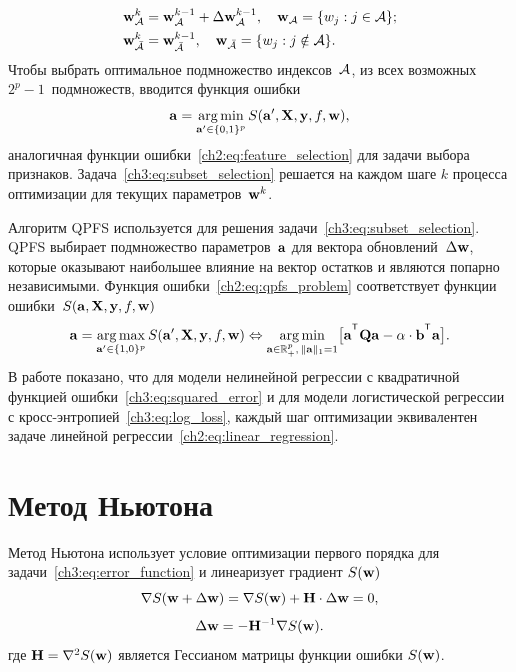 \begin{align*}
\mathbf{w}_{\mathcal{A}}^k &= \mathbf{w}_{\mathcal{A}}^{k - 1} + \Delta \mathbf{w}_{\mathcal{A}}^{k - 1}, \quad \mathbf{w}_{\mathcal{A}} = \{w_j: j \in \mathcal{A} \}; \\
\mathbf{w}_{\bar{\mathcal{A}}}^k &= \mathbf{w}_{\bar{\mathcal{A}}}^{k - 1}, \quad \mathbf{w}_{\bar{\mathcal{A}}} = \{w_j: j \notin \mathcal{A} \}.
\end{align*}
Чтобы выбрать оптимальное подмножество индексов~$\mathcal{A}$, из всех возможных $2^p - 1$~подмножеств, вводится функция ошибки
\begin{equation}
\mathbf{a} = \mathop{\arg \min}\limits_{\mathbf{a}' \in \{0, 1\}^p} S(\mathbf{a}', \mathbf{X}, \mathbf{y}, f, \mathbf{w}),
\label{ch3:eq:subset_selection}
\end{equation}
аналогичная функции ошибки~\eqref{ch2:eq:feature_selection} для задачи выбора признаков. 
Задача~\eqref{ch3:eq:subset_selection} решается на каждом шаге $k$ процесса оптимизации для текущих параметров~$\mathbf{w}^k$.

Алгоритм QPFS используется для решения задачи~\eqref{ch3:eq:subset_selection}.
QPFS выбирает подмножество параметров~$\mathbf{a}$ для вектора обновлений~$ \Delta \mathbf{w}$, которые оказывают наибольшее влияние на вектор остатков и являются попарно независимыми.
Функция ошибки~\eqref{ch2:eq:qpfs_problem} соответствует функции ошибки~$S(\mathbf{a}, \mathbf{X}, \mathbf{y}, f, \mathbf{w})$
\begin{equation}
\ba = \argmax_{\ba' \in \{1, 0\}^p} S(\ba', \bX, \by, f, \bw) \Leftrightarrow \argmin_{\ba  \in \bbR^p_+, \, \|\ba\|_1=1} \bigl[\ba^{\T} \bQ \ba - \alpha \cdot \mathbf{b}^{\T} \ba \bigr].
\end{equation}
В работе показано, что для модели нелинейной регрессии с квадратичной функцией ошибки~\eqref{ch3:eq:squared_error} и для модели логистической регрессии с кросс-энтропией~\eqref{ch3:eq:log_loss}, каждый шаг оптимизации эквивалентен задаче линейной регрессии~\eqref{ch2:eq:linear_regression}.



\section{Метод Ньютона}

Метод Ньютона использует условие оптимизации первого порядка для задачи~\eqref{ch3:eq:error_function} и линеаризует градиент $S (\mathbf{w})$
\[
\nabla S (\mathbf{w} + \Delta \mathbf{w}) = \nabla S(\mathbf{w}) + \mathbf{H} \cdot \Delta \mathbf{w} = 0,
\]
\[
\Delta \mathbf{w} = - \mathbf{H}^{-1} \nabla S(\mathbf{w}).
\]
где $\mathbf{H} = \nabla^2 S(\mathbf{w})$ является Гессианом матрицы функции ошибки $S(\mathbf{w})$.


